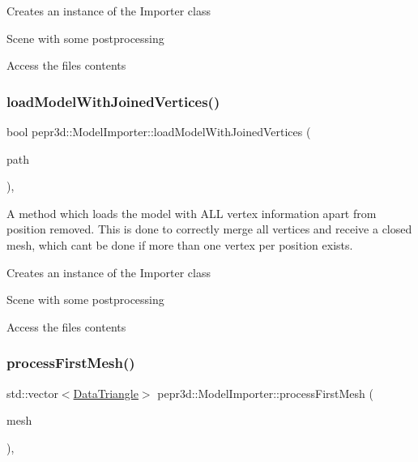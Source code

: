 Creates an instance of the Importer class

Scene with some postprocessing

Access the file\textquotesingle{}s contents \mbox{\label{classpepr3d_1_1_model_importer_aa9220087658f958e335ed87632c364be}} 
\subsubsection{\texorpdfstring{loadModelWithJoinedVertices()}{loadModelWithJoinedVertices()}}
{\footnotesize\ttfamily bool pepr3d\+::\+Model\+Importer\+::load\+Model\+With\+Joined\+Vertices (\begin{DoxyParamCaption}\item[{const std\+::string \&}]{path }\end{DoxyParamCaption})\hspace{0.3cm}{\ttfamily [inline]}, {\ttfamily [private]}}



A method which loads the model with A\+LL vertex information apart from position removed. This is done to correctly merge all vertices and receive a closed mesh, which can\textquotesingle{}t be done if more than one vertex per position exists. 

Creates an instance of the Importer class

Scene with some postprocessing

Access the file\textquotesingle{}s contents \mbox{\label{classpepr3d_1_1_model_importer_acf84e4d461505e722c827812418ef0d1}} 
\subsubsection{\texorpdfstring{processFirstMesh()}{processFirstMesh()}}
{\footnotesize\ttfamily std\+::vector$<$\mbox{\hyperlink{classpepr3d_1_1_data_triangle}{Data\+Triangle}}$>$ pepr3d\+::\+Model\+Importer\+::process\+First\+Mesh (\begin{DoxyParamCaption}\item[{ai\+Mesh $\ast$}]{mesh }\end{DoxyParamCaption})\hspace{0.3cm}{\ttfamily [inline]}, {\ttfamily [private]}}



